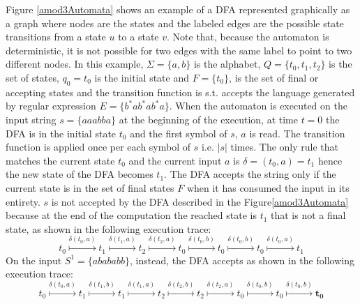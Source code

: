 Figure \ref{amod3Automata} shows an example of a DFA represented graphically as a graph where nodes are the states and the labeled edges are the possible state transitions from a state $u$ to a state $v$.
Note that, because the automaton is deterministic, it is not possible for two
edges with the same label to point to two different nodes.
In this example, $ \Sigma = \{a,b\}$ is the alphabet, $ Q = \{t_0,t_1,t_2\}$ is the set of states, $ q_0 = t_0$ is the initial state and $ F = \{t_0\} $, is the set of final or accepting states and the transition function is s.t. accepts the language  generated by regular expression $E=\{b^*ab^*ab^*a\}$.
When the automaton is executed on the input string $s=\{aaabba\}$ at the beginning of the execution, at time $t=0$ the DFA is in the initial state $t_0$ and the first
symbol of $s$, $a$ is read.
The transition function is applied once per each symbol of $s$
i.e. $\left\vert{s}\right\vert$ times. The only rule that matches 
the current state $t_0$ and the current input $a$ is $\delta=(t_0,a)=t_1 $ hence the new state of the DFA becomes $t_1$. 
The DFA accepts the string only if the current state is in the set of final states $F$ when it has consumed the input in its entirety.
$s$ is not accepted by the DFA described in the Figure\ref{amod3Automata} because
at the end of the computation the reached state is $t_1$ that is not a final state, as shown in the following execution trace:
 \[
 t_0\overset{\delta(t_0,a)}
 {\longmapsto}t_{1}\overset{\delta(t_1,a)}
 {\longmapsto}t_{2}\overset{\delta(t_2,a)}
 {\longmapsto} t_{0}\overset{\delta(t_0,b)}
 {\longmapsto}t_{0}\overset{\delta(t_0,b)}
 {\longmapsto}t_{0}\overset{\delta(t_0,a)}
 {\longmapsto} t_{1}
\]
On the input $S^1=\{abababb\}$, instead, the DFA accepts as shown in the following execution trace:
 \[
 t_0\overset{\delta(t_0,a)}
 {\longmapsto}t_{1}\overset{\delta(t_1,b)}
 {\longmapsto}t_{1}\overset{\delta(t_1,a)}
 {\longmapsto} t_{2}\overset{\delta(t_2,b)}
 {\longmapsto}t_{2}\overset{\delta(t_2,a)}
 {\longmapsto}t_{0}\overset{\delta(t_0,b)}
 {\longmapsto}t_{0}\overset{\delta(t_0,b)}
 {\longmapsto}\mathbf{t_{0}}
\]

